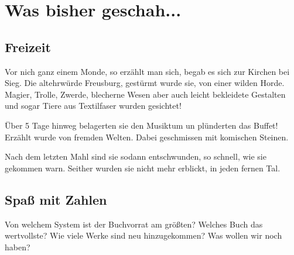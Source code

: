 
%



\usepackage{enumitem}
\usepackage{cancel}









%



\makemultititle
%

\section{Was bisher geschah...}

\subsection{Freizeit}
Vor nich ganz einem Monde, so erzählt man sich, begab es sich zur Kirchen bei Sieg.
Die altehrwürde Freusburg, gestürmt wurde sie, von einer wilden Horde.
Magier, Trolle, Zwerde, blecherne Wesen aber auch leicht bekleidete Gestalten und sogar Tiere aus Textilfaser wurden gesichtet!

Über 5 Tage hinweg belagerten sie den Musiktum un plünderten das Buffet!
Erzählt wurde von fremden Welten.
Dabei geschmissen mit komischen Steinen.

Nach dem letzten Mahl sind sie sodann entschwunden, so schnell, wie sie gekommen warn.
Seither wurden sie nicht mehr erblickt, in jeden fernen Tal.

\subsection{Spaß mit Zahlen}
Von welchem System ist der Buchvorrat am größten?
Welches Buch das wertvollste?
Wie viele Werke sind neu hinzugekommen?
Was wollen wir noch haben?

